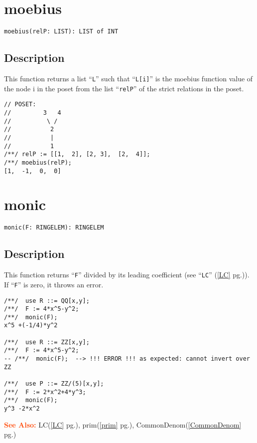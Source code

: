 \documentclass[a4paper]{mybook}
\newenvironment{command}{}{} %
\newcommand\SeeAlso{\par\textcolor{OrangeRed}{\textbf{\large See Also: }}}
\begin{document}
\section{moebius}
\label{moebius}
\begin{command} %


\begin{Verbatim}[label=syntax, rulecolor=\color{MidnightBlue},
frame=single]
moebius(relP: LIST): LIST of INT
\end{Verbatim}


\subsection*{Description}

This function returns a list ``\verb&L&'' such that ``\verb&L[i]&'' is the
moebius function value of the node i in the poset from the list ``\verb&relP&''
of the strict relations in the poset.
\par 
\begin{Verbatim}[label=example, rulecolor=\color{PineGreen}, frame=single]
// POSET:
//         3   4
//          \ /
//           2
//           |
//           1
/**/ relP := [[1,  2], [2, 3],  [2,  4]];
/**/ moebius(relP);
[1,  -1,  0,  0]
\end{Verbatim}


\end{command} %

\section{monic}
\label{monic}
\begin{command} %


\begin{Verbatim}[label=syntax, rulecolor=\color{MidnightBlue},
frame=single]
monic(F: RINGELEM): RINGELEM
\end{Verbatim}


\subsection*{Description}

This function returns ``\verb&F&'' divided by its leading coefficient (see ``\verb&LC&'' (\ref{LC} pg.\pageref{LC})).
If ``\verb&F&'' is zero, it throws an error.
\begin{Verbatim}[label=example, rulecolor=\color{PineGreen}, frame=single]
/**/  use R ::= QQ[x,y];
/**/  F := 4*x^5-y^2;
/**/  monic(F);
x^5 +(-1/4)*y^2

/**/  use R ::= ZZ[x,y];
/**/  F := 4*x^5-y^2;
-- /**/  monic(F);  --> !!! ERROR !!! as expected: cannot invert over ZZ

/**/  use P ::= ZZ/(5)[x,y];
/**/  F := 2*x^2+4*y^3;
/**/  monic(F);
y^3 -2*x^2
\end{Verbatim}


\SeeAlso %
  LC(\ref{LC} pg.\pageref{LC}), 
    prim(\ref{prim} pg.\pageref{prim}), 
    CommonDenom(\ref{CommonDenom} pg.\pageref{CommonDenom})
\end{command} %
\end{document}
